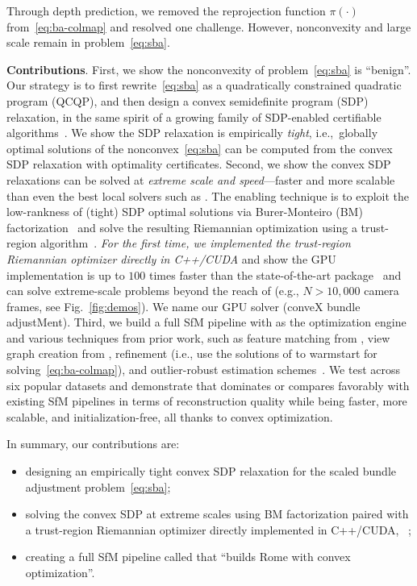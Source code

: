 Through depth prediction, we removed the reprojection function $\pi(\cdot)$ from~\eqref{eq:ba-colmap} and resolved one challenge. However, nonconvexity and large scale remain in problem~\eqref{eq:sba}.

\textbf{Contributions}. First, we show the nonconvexity of problem~\eqref{eq:sba} is ``benign''. Our strategy is to first rewrite~\eqref{eq:sba} as a quadratically constrained quadratic program (QCQP), and then design a convex semidefinite program (SDP) relaxation, in the same spirit of a growing family of SDP-enabled certifiable algorithms~\cite{yang2022certifiably,rosen2019se,yu2024sim,kang2024fast,barfoot2023certifiably}. We show the SDP relaxation is empirically \emph{tight}, i.e.,~globally optimal solutions of the nonconvex~\eqref{eq:sba} can be computed from the convex SDP relaxation with optimality certificates. Second, we show the convex SDP relaxations can be solved at \emph{extreme scale and speed}---faster and more scalable than even the best local solvers such as \ceres. The enabling technique is to exploit the low-rankness of (tight) SDP optimal solutions via Burer-Monteiro (BM) factorization~\cite{burer2003nonlinear} and solve the resulting Riemannian optimization using a trust-region algorithm~\cite{boumal2023introduction}. \emph{For the first time, we implemented the trust-region Riemannian optimizer directly in C++/CUDA} and show the GPU implementation is up to $100$ times faster than the state-of-the-art \manopt package~\cite{boumal2014manopt} and can solve extreme-scale problems beyond the reach of \manopt (e.g., $N>10,000$ camera frames, see Fig.~\ref{fig:demos}). We name our GPU solver \nameshort (conveX bundle adjustMent). Third, we build a full SfM pipeline with \nameshort as the optimization engine and various techniques from prior work, such as feature matching from \colmap, view graph creation from \glomap, \ceres refinement (i.e., use the solutions of \nameshort to warmstart \ceres for solving~\eqref{eq:ba-colmap}), and outlier-robust estimation schemes~\cite{antonante2021outlier}. We test \xmsfm across six popular datasets and demonstrate that \xmsfm dominates or compares favorably with existing SfM pipelines in terms of reconstruction quality while being faster, more scalable, and initialization-free, all thanks to convex optimization. 

In summary, our contributions are:
\begin{itemize}
    \item designing an empirically tight convex SDP relaxation for the scaled bundle adjustment problem~\eqref{eq:sba};
    \item solving the convex SDP at extreme scales using BM factorization paired with a trust-region Riemannian optimizer directly implemented in C++/CUDA, \ie~\nameshort;
    \item creating a full SfM pipeline called \xmsfm that ``builds Rome with convex optimization''.
\end{itemize}


